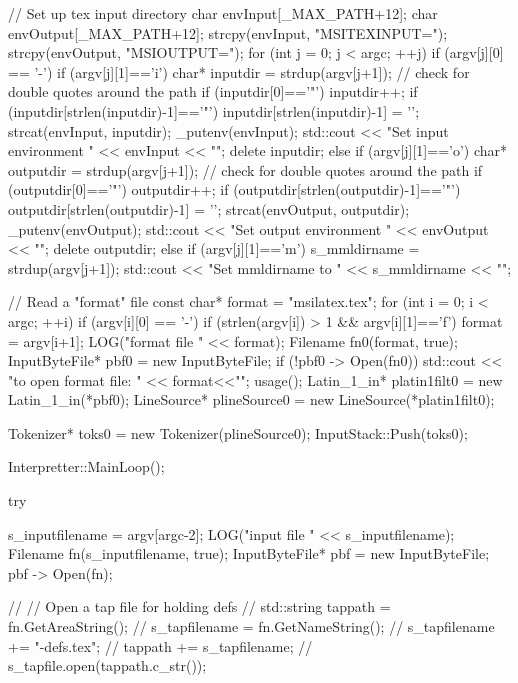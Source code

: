 {{{{{{{{{{{{{   // Set up tex input directory
   char envInput[_MAX_PATH+12];
   char envOutput[_MAX_PATH+12];
   strcpy(envInput, "MSITEXINPUT=");
   strcpy(envOutput, "MSIOUTPUT=");
   for (int j = 0; j < argc; ++j)
   {
      if (argv[j][0] == '-')
      {
        if (argv[j][1]=='i')
        {
         char* inputdir = strdup(argv[j+1]);
         // check for double quotes around the path
         if (inputdir[0]=='"') inputdir++;
         if (inputdir[strlen(inputdir)-1]=='"')
            inputdir[strlen(inputdir)-1] = '\0';
         strcat(envInput, inputdir);
         _putenv(envInput);
         std::cout << "Set input environment " << envInput << "\n";
         delete inputdir;
        }
        else if (argv[j][1]=='o')
        {
          char* outputdir = strdup(argv[j+1]);
          // check for double quotes around the path
          if (outputdir[0]=='"') outputdir++;
          if (outputdir[strlen(outputdir)-1]=='"')
           outputdir[strlen(outputdir)-1] = '\0';
          strcat(envOutput, outputdir);
          _putenv(envOutput);
          std::cout << "Set output environment " << envOutput << "\n";
          delete outputdir;
        }
        else if (argv[j][1]=='m')
        {
          s_mmldirname = strdup(argv[j+1]);
          std::cout << "Set mmldirname to " << s_mmldirname << "\n";
        }
      }
   }

   // Read a "format" file
   const char* format = "msilatex.tex";
   for (int i = 0; i < argc; ++i){
      if (argv[i][0] == '-'){
         if (strlen(argv[i]) > 1 && argv[i][1]=='f'){
           format = argv[i+1];
         }
      }
   }
   LOG("\nReading format file " << format);
   Filename fn0(format, true);
   InputByteFile* pbf0 = new InputByteFile;
   if (!pbf0 -> Open(fn0)){
      std::cout << "\nFailed to open format file: " << format<<"\n";
      usage();
   }
   Latin_1_in*  platin1filt0 = new Latin_1_in(*pbf0);
   LineSource* plineSource0 = new LineSource(*platin1filt0);

   Tokenizer* toks0 = new Tokenizer(plineSource0);
   InputStack::Push(toks0);

   Interpretter::MainLoop();

   try{
      s_inputfilename = argv[argc-2];
      LOG("\nReading input file " << s_inputfilename);
      Filename fn(s_inputfilename, true);
      InputByteFile* pbf = new InputByteFile;
      pbf -> Open(fn);

      // // Open a tap file for holding defs
      // std::string tappath = fn.GetAreaString();
      // s_tapfilename = fn.GetNameString();
      // s_tapfilename += "-defs.tex";
      // tappath += s_tapfilename;
      // s_tapfile.open(tappath.c_str());

}}}}}}}}}}}}}}
